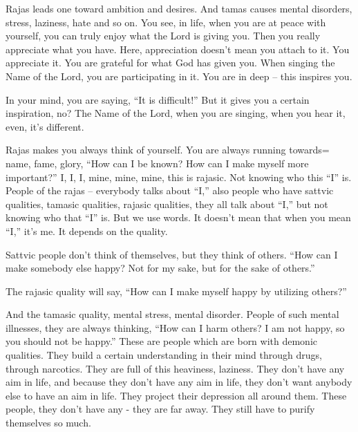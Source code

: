 Rajas leads one toward ambition and desires. And tamas causes mental disorders, stress, laziness, hate and so on. You see, in life, when you are at peace with yourself, you can truly enjoy what the Lord is giving you. Then you really appreciate what you have. Here, appreciation doesn’t mean you attach to it. You appreciate it. You are grateful for what God has given you. When singing the Name of the Lord, you are participating in it. You are in deep – this inspires you. 

In your mind, you are saying, “It is difficult!” But it gives you a certain inspiration, no? The Name of the Lord, when you are singing, when you hear it, even, it’s different.

Rajas makes you always think of yourself. You are always running towards= name, fame, glory, “How can I be known? How can I make myself more important?” I, I, I, mine, mine, mine, this is rajasic. Not knowing who this “I” is. People of the rajas – everybody talks about “I,” also people who have sattvic qualities, tamasic qualities, rajasic qualities, they all talk about “I,” but not knowing who that “I” is. But we use words. It doesn’t mean that when you mean “I,” it’s me. It depends on the quality.

Sattvic people don’t think of themselves, but they think of others. “How can I make somebody else happy? Not for my sake, but for the sake of others.”

The rajasic quality will say, “How can I make myself happy by utilizing others?”

And the tamasic quality, mental stress, mental disorder. People of such mental illnesses, they are always thinking, “How can I harm others? I am not happy, so you should not be happy.” These are people which are born with demonic qualities. They build a certain understanding in their mind through drugs, through narcotics. They are full of this heaviness, laziness. They don’t have any aim in life, and because they don’t have any aim in life, they don’t want anybody else to have an aim in life. They project their depression all around them. These people, they don’t have any - they are far away. They still have to purify themselves so much.

